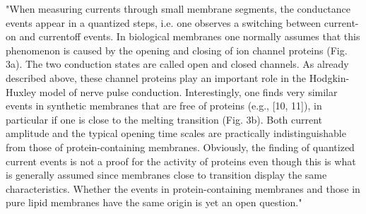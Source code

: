 "When measuring currents through small membrane segments, the conductance events appear in a quantized steps,
i.e. one observes a switching between current-on and currentoff events. In biological membranes one normally assumes
that this phenomenon is caused by the opening and closing
of ion channel proteins (Fig. 3a). The two conduction states
are called open and closed channels. As already described
above, these channel proteins play an important role in the
Hodgkin-Huxley model of nerve pulse conduction. Interestingly, one finds very similar events in synthetic membranes
that are free of proteins (e.g., [10, 11]), in particular if one
is close to the melting transition (Fig. 3b). Both current
amplitude and the typical opening time scales are practically indistinguishable from those of protein-containing
membranes. Obviously, the finding of quantized current
events is not a proof for the activity of proteins even though
this is what is generally assumed since membranes close
to transition display the same characteristics. Whether the
events in protein-containing membranes and those in pure
lipid membranes have the same origin is yet an open question."~\cite{HeimburgPhysikOfNerves:2009}

